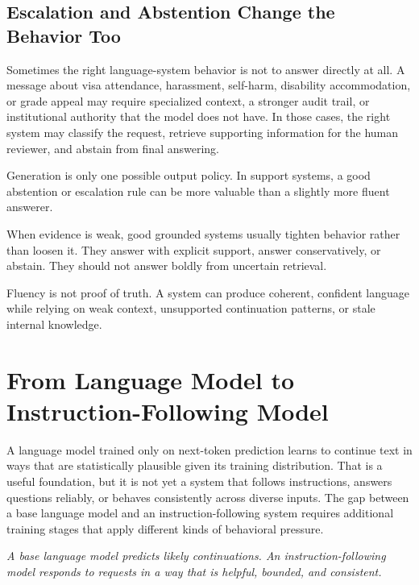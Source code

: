 \subsection{Escalation and Abstention Change the Behavior Too}

Sometimes the right language-system behavior is not to answer directly at all. A message about visa attendance, harassment, self-harm, disability accommodation, or grade appeal may require specialized context, a stronger audit trail, or institutional authority that the model does not have. In those cases, the right system may classify the request, retrieve supporting information for the human reviewer, and abstain from final answering.

\begin{practicalnote}
Generation is only one possible output policy. In support systems, a good abstention or escalation rule can be more valuable than a slightly more fluent answerer.
\end{practicalnote}

\begin{practicalnote}
When evidence is weak, good grounded systems usually tighten behavior rather than loosen it. They answer with explicit support, answer conservatively, or abstain. They should not answer boldly from uncertain retrieval.
\end{practicalnote}

\begin{failurebox}
Fluency is not proof of truth. A system can produce coherent, confident language while relying on weak context, unsupported continuation patterns, or stale internal knowledge.
\end{failurebox}

\section{From Language Model to Instruction-Following Model}

A language model trained only on next-token prediction learns to continue text in ways that are statistically plausible given its training distribution. That is a useful foundation, but it is not yet a system that follows instructions, answers questions reliably, or behaves consistently across diverse inputs. The gap between a base language model and an instruction-following system requires additional training stages that apply different kinds of behavioral pressure.

\begin{center}
\emph{A base language model predicts likely continuations. An instruction-following model responds to requests in a way that is helpful, bounded, and consistent.}
\end{center}

